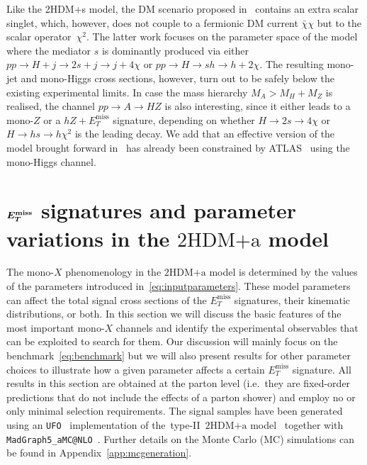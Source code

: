 \documentclass[review]{elsarticle}
\newcommand{\MET}{\ensuremath{E_T^\mathrm{miss}}\xspace}
\newcommand{\hdma}{\ensuremath{\textrm{2HDM+a}}\xspace}
\def\bm#1{\mbox{\boldmath$#1$\unboldmath}}
\begin{document}
 Like the 2HDM+s model, the DM scenario proposed in~\cite{vonBuddenbrock:2016rmr} contains an extra scalar singlet, which, however, does not couple to a fermionic DM current $\bar \chi \chi$ but to the scalar operator~$\chi^2$. The latter work focuses on the parameter space of the model where the mediator $s$ is dominantly produced via either  $pp \to H + j \to 2s + j \to j + 4 \chi$ or $pp \to H \to sh \to h + 2\chi$. The resulting mono-jet and mono-Higgs cross sections, however, turn out to be safely below the existing experimental limits. In case the mass hierarchy  $M_A > M_H + M_Z$ is realised, the channel $pp \to A \to HZ$ is also interesting, since it either leads to a mono-$Z$ or a $hZ+\MET$ signature, depending on whether $H \to 2 s \to 4 \chi$ or $H \to h s \to h \chi^2$ is the leading decay. We add that an effective version of the model brought forward in~\cite{vonBuddenbrock:2016rmr}  has already been constrained by ATLAS~\cite{Aaboud:2017uak} using the mono-Higgs channel.  


\section{$\bm{E_T^{\rm miss}}$ signatures and parameter variations in the \hdma model}
\label{sec:experimentbasics}

The mono-$X$ phenomenology in the  \hdma model is determined by the values of the parameters introduced in~\eqref{eq:inputparameters}. These model parameters can affect the total signal cross sections of the $\MET$ signatures, their kinematic distributions, or both. In this section we will discuss the basic features of the most important mono-$X$ channels and identify the experimental observables that can be exploited to search for them. Our discussion will  mainly focus on the benchmark~\eqref{eq:benchmark} but we will also present results for other parameter choices to illustrate how a given parameter affects a certain $\MET$ signature.  All results in this section are obtained at the parton level (i.e.~they are fixed-order predictions that do not include the effects of a parton shower) and employ no or only minimal selection requirements. The signal samples have been generated using an {\tt UFO}~\cite{Degrande:2011ua} implementation of the~type-II~\hdma model~\cite{hdmaUFO} together with {\tt MadGraph5\_aMC@NLO}~\cite{Alwall:2014hca}. Further details on the Monte Carlo (MC) simulations can be found in Appendix~\ref{app:mcgeneration}.
\end{document}
